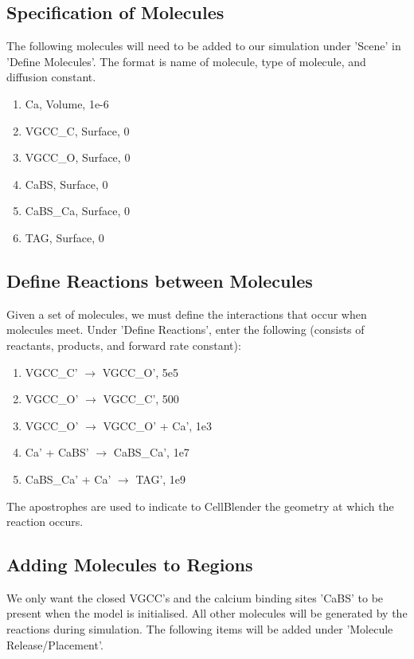 \documentclass[twoside,a4paper]{refart}
\begin{document}
\subsection{Specification of Molecules}
The following molecules will need to be added to our simulation under 'Scene' in 'Define Molecules'. The format is name of molecule, type of molecule, and diffusion constant.

\begin{enumerate}
    \item Ca, Volume, 1e-6
    \item VGCC\_C, Surface, 0
    \item VGCC\_O, Surface, 0
    \item CaBS, Surface, 0
    \item CaBS\_Ca, Surface, 0
    \item TAG, Surface, 0
\end{enumerate}

\subsection{Define Reactions between Molecules}
Given a set of molecules, we must define the interactions that occur when molecules meet. Under 'Define Reactions', enter the following (consists of reactants, products, and forward rate constant):

\begin{enumerate}
    \item VGCC\_C' $\to$ VGCC\_O', 5e5
    \item VGCC\_O' $\to$ VGCC\_C', 500
    \item VGCC\_O' $\to$ VGCC\_O' + Ca', 1e3
    \item Ca' + CaBS' $\to$ CaBS\_Ca', 1e7
    \item CaBS\_Ca' + Ca' $\to$ TAG', 1e9
\end{enumerate}

The apostrophes are used to indicate to CellBlender the geometry at which the reaction occurs.


\subsection{Adding Molecules to Regions}
We only want the closed VGCC's and the calcium binding sites 'CaBS' to be present when the model is initialised. All other molecules will be generated by the reactions during simulation. The following items will be added under 'Molecule Release/Placement'. 
\end{document}

